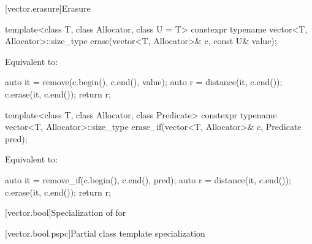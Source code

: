 [vector.erasure]{Erasure}

%
\begin{itemdecl}
template<class T, class Allocator, class U = T>
  constexpr typename vector<T, Allocator>::size_type
    erase(vector<T, Allocator>& c, const U& value);
\end{itemdecl}

\begin{itemdescr}
\pnum
\effects
Equivalent to:
\begin{codeblock}
auto it = remove(c.begin(), c.end(), value);
auto r = distance(it, c.end());
c.erase(it, c.end());
return r;
\end{codeblock}
\end{itemdescr}

%
\begin{itemdecl}
template<class T, class Allocator, class Predicate>
  constexpr typename vector<T, Allocator>::size_type
    erase_if(vector<T, Allocator>& c, Predicate pred);
\end{itemdecl}

\begin{itemdescr}
\pnum
\effects
Equivalent to:
\begin{codeblock}
auto it = remove_if(c.begin(), c.end(), pred);
auto r = distance(it, c.end());
c.erase(it, c.end());
return r;
\end{codeblock}
\end{itemdescr}

[vector.bool]{Specialization of  for }

[vector.bool.pspc]{Partial class template specialization }

